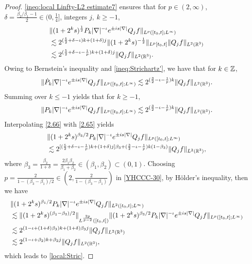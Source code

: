\documentclass[11pt,twoside]{article}
\def\Z{\mathop{\mathbb Z\kern 0pt}\nolimits}
\def\R{\mathop{\mathbb R\kern 0pt}\nolimits}
\def\f{\frac}
\def\ls{\lesssim}
\newcommand{\pk}{\dot{P}_k}
\theoremstyle{plain}
\theoremstyle{definition}
\numberwithin{equation}{section}
\begin{document}
	\begin{proof}
		\eqref{ineq:local Linfty-L2 estimate7} ensures that for $p\in(2,\infty)$, $\delta=\f{\beta_2/\beta_1-1}{2}\in(0,\f14]$,
integers $j,\ k\ge -1$,
		\begin{equation}\label{2.65}
			\begin{aligned}
				&\|(1+2^ks)^{\f12}P_k|\nabla|^{-\iota}e^{\pm is|\nabla|}Q_jf\|_{L^p([t_0,t];L^\infty)}\\
				&\ls
				2^{(\f52+\delta-\iota) k+(1+\delta)j}\|(1+2^ks)^{-\f12}\|_{L^p[t_0,t]}\| Q_j f\|_{L^2(\R^3)}\\
				&\ls
				2^{(\f52+\delta-\iota-\f1p) k+(1+\delta)j}\|Q_jf\|_{L^2(\R^3)}.
			\end{aligned}
		\end{equation}
		Owing to Bernstein's inequality and \eqref{ineq:Strichartz'}, we have that for $k\in\Z$,
		\begin{equation*}
			\|\pk |\nabla|^{-\iota} e^{\pm is|\nabla|}Q_jf\|_{L^p([t_0,t];L^\infty)}
			\ls{2^{(\f32-\iota-\f1p) k}}\| Q_jf\|_{L^2(\R^3)}.
		\end{equation*}
		Summing over $k\le-1$ yields that for $k\ge -1$,
		\begin{equation}\label{2.66}
			\|P_k|\nabla|^{-\iota} e^{\pm is|\nabla|}Q_jf\|_{L^p([t_0,t];L^\infty)}
			\ls{2^{(\f32-\iota-\f1p) k}}\|Q_jf\|_{L^2(\R^3)}.
		\end{equation}
Interpolating \eqref{2.66} with \eqref{2.65} yields
\begin{equation}\label{YHCCC-30}
\begin{split}
&\|(1+2^ks)^{\beta_3/2}P_k|\nabla|^{-\iota}e^{\pm is|\nabla|}Q_jf\|_{L^p([t_0,t];L^\infty)}\\
&\ls{2^{[(\f52+\delta-\iota-\f1p) k+(1+\delta)j]\beta_3 +(\f32-\iota-\f1p)k(1-\beta_3)}}\|Q_jf\|_{L^2(\R^3)},
\end{split}
\end{equation}
where $\beta_3 = \f{\beta_2}{1+\delta} = \f{2\beta_1\beta_2}{\beta_1+\beta_2}\in(\beta_1,\beta_2)\subset(0,1)$.
Choosing $p=\frac{2}{1-(\beta_3-\beta_1)/2}\in(2,\frac{2}{1-(\beta_3-\beta_1)})$ in \eqref{YHCCC-30},
by H\"{o}lder's inequality, then we have
		\begin{equation*}
			\begin{split}
				&\|(1+2^ks)^{\beta_1/2}P_k|\nabla|^{-\iota}e^{\pm is|\nabla|}Q_jf\|_{L^2([t_0,t];L^\infty)}\\
				&\ls\|(1+2^ks)^{(\beta_1-\beta_3)/2}\|_{L^\frac{2p}{p-2}([t_0,t])}
				\|(1+2^ks)^{\beta_3/2}P_k|\nabla|^{-\iota}e^{\pm is|\nabla|}Q_jf\|_{L^p([t_0,t];L^\infty)}\\
				&\ls2^{(1-\iota+(1+\delta)\beta_3) k+(1+\delta)\beta_3j}\|Q_jf\|_{L^2(\R^3)}\\
				&\ls2^{(1-\iota+\beta_2) k+\beta_2j}\|Q_jf\|_{L^2(\R^3)},
			\end{split}
		\end{equation*}
		which leads to \eqref{local:Stric}.
	\end{proof}
\end{document}
